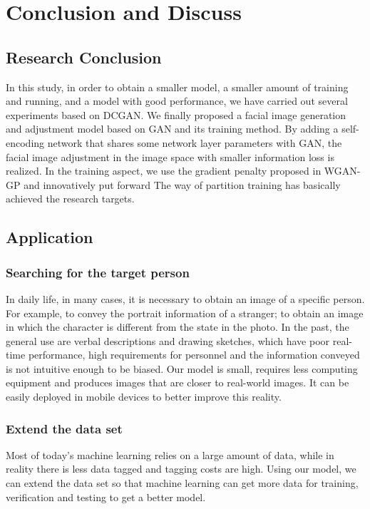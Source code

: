 \section{Conclusion and Discuss}
\subsection{Research Conclusion}
In this study, in order to obtain a smaller model, a smaller amount of training and running, and a model with good performance, we have carried out several experiments based on DCGAN.
We finally proposed a facial image generation and adjustment model based on GAN and its training method.
By adding a self-encoding network that shares some network layer parameters with GAN, the facial image adjustment in the image space with smaller information loss is realized.
In the training aspect, we use the gradient penalty proposed in WGAN-GP and innovatively put forward The way of partition training has basically achieved the research targets.

\subsection{Application}
\subsubsection*{Searching for the target person}
In daily life, in many cases, it is necessary to obtain an image of a specific person.
For example, to convey the portrait information of a stranger; to obtain an image in which the character is different from the state in the photo.
In the past, the general use are verbal descriptions and drawing sketches, which have poor real-time performance, high requirements for personnel and the information conveyed is not intuitive enough to be biased.
Our model is small, requires less computing equipment and produces images that are closer to real-world images.
It can be easily deployed in mobile devices to better improve this reality.
\subsubsection*{Extend the data set}
Most of today's machine learning relies on a large amount of data, while in reality there is less data tagged and tagging costs are high.
Using our model, we can extend the data set so that machine learning can get more data for training, verification and testing to get a better model.

